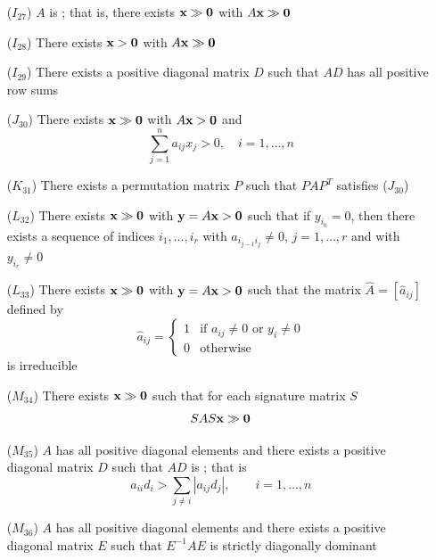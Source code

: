 \documentclass[aspectratio=169]{beamer}
\begin{document}
\begin{frame}
\addtocounter{theorem}{-1}
\begin{theorem}[Continued]
\begin{enumerate}
\item[($I_{27}$)] $A$ is ; that is, there exists $\bx\gg\b0$ with $A\bx\gg\b0$
\item[($I_{28}$)] There exists $\bx>\b0$ with $A\bx\gg\b0$
\item[($I_{29}$)] There exists a positive diagonal matrix $D$ such that $AD$ has all positive row sums
\item[($J_{30}$)] There exists $\bx\gg\b0$ with $A\bx>\b0$ and
\[
\sum_{j=1}^n a_{ij}x_j>0,\quad i=1,\ldots,n
\]
\item[($K_{31}$)] There exists a permutation matrix $P$ such that $PAP^T$ satisfies ($J_{30}$)
\end{enumerate}
\end{theorem}
\end{frame}

\begin{frame}
\addtocounter{theorem}{-1}
\begin{theorem}[Continued]
\begin{enumerate}
\item[($L_{32}$)] There exists $\bx\gg\b0$ with $\by=A\bx>\b0$ such that if $y_{i_0}=0$, then there exists a sequence of indices $i_1,\ldots,i_r$ with $a_{i_{j-1}i_j}\neq 0$, $j=1,\ldots,r$ and with $y_{i_r}\neq 0$
\item[($L_{33}$)] There exists $\bx\gg\b0$ with $\by=A\bx>\b0$ such that the matrix $\hat A=[\hat a_{ij}]$ defined by
\[
\hat a_{ij} =
\begin{cases}
1 & \text{if } a_{ij}\neq 0\text{ or }y_i\neq 0 \\
0 & \text{otherwise}
\end{cases}
\]
is irreducible
\end{enumerate}
\end{theorem}
\end{frame}

\begin{frame}
\addtocounter{theorem}{-1}
\begin{theorem}[Continued]
\begin{enumerate}
\item[($M_{34}$)] There exists $\bx\gg\b0$ such that for each signature matrix $S$
\[
SAS\bx\gg\b0
\]
\item[($M_{35}$)] $A$ has all positive diagonal elements and there exists a positive diagonal matrix $D$ such that $AD$ is ; that is
\[
a_{ii}d_i>\sum_{j\neq i}|a_{ij}d_j|,\qquad i=1,\ldots,n
\]
\item[($M_{36}$)] $A$ has all positive diagonal elements and there exists a positive diagonal matrix $E$ such that $E^{-1}AE$ is strictly diagonally dominant
\end{enumerate}
\end{theorem}
\end{frame}
\end{document}
